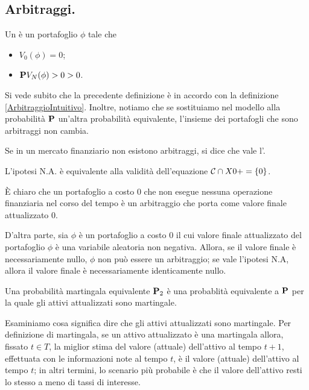 \subsection{Arbitraggi.}\label{Arbitraggi}
\begin{Definition}
	Un  \`e un portafoglio $\phi$ tale che
	\begin{itemize}
		\item $V_0(\phi) = 0$;
		\item $\Probability{V_N(\phi) > 0} > 0$.
	\end{itemize}
\end{Definition}
\par Si vede subito che la precedente definizione \`e in accordo con la definizione \ref{ArbitraggioIntuitivo}. Inoltre, notiamo che se sostituiamo nel modello alla probabilit\`a $\Probability$ un'altra probabilit\`a equivalente, l'insieme dei portafogli che sono arbitraggi non cambia.
\begin{Definition}
	Se in un mercato finanziario non esistono arbitraggi, si dice che vale l'.
\end{Definition}
\begin{Theorem}
	L'ipotesi N.A. \`e equivalente alla validit\`a dell'equazione $\mathcal{C} \cap X{0}{+} = \lbrace 0 \rbrace$.
\end{Theorem}
\Proof \`E chiaro che un portafoglio a costo $0$ che non esegue nessuna operazione finanziaria nel corso del tempo \`e un arbitraggio che porta come valore finale attualizzato $0$.
\par D'altra parte, sia $\phi$ \`e un portafoglio a costo $0$ il cui valore finale attualizzato del portafoglio $\phi$ \`e una variabile aleatoria non negativa. Allora, se il valore finale \`e necessariamente nullo, $\phi$ non pu\`o essere un arbitraggio; se vale l'ipotesi N.A, allora il valore finale \`e necessariamente identicamente nullo. \EndProof
\begin{Definition}
	Una probabilit\`a martingala equivalente $\Probability_2$ \`e una probablit\`a equivalente a $\Probability$ per la quale gli attivi attualizzati sono martingale.
\end{Definition}
\par Esaminiamo cosa significa dire che gli attivi attualizzati sono martingale. Per definizione di martingala, se un attivo attualizzato \`e una martingala allora, fissato $t \in T$, la miglior stima del valore (attuale) dell'attivo al tempo $t + 1$, effettuata con le informazioni note al tempo $t$, \`e il valore (attuale) dell'attivo al tempo $t$; in altri termini, lo scenario pi\`u probabile \`e che il valore dell'attivo resti lo stesso a meno di tassi di interesse.

